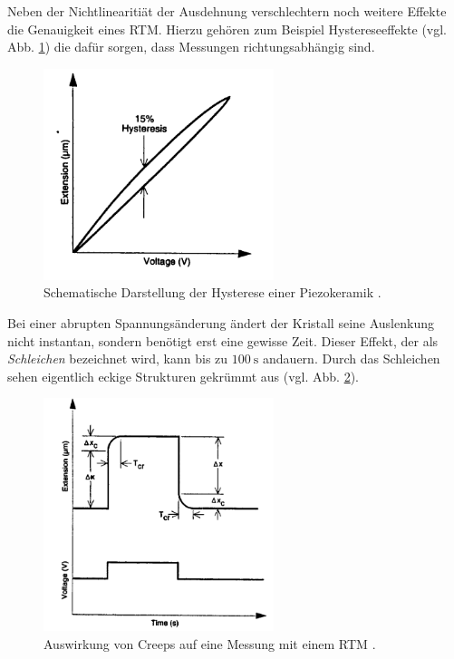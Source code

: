 Neben der Nichtlinearitiät der Ausdehnung verschlechtern noch weitere %
Effekte die Genauigkeit eines RTM. Hierzu gehören zum Beispiel Hystereseeffekte (vgl. Abb. \ref{fig: hysterese}) die dafür sorgen,
dass Messungen richtungsabhängig sind.
\begin{figure}[!h]
  \centering
  \includegraphics[width=0.6\textwidth]{./pics/hysterese.png}
  \caption{Schematische Darstellung der Hysterese einer Piezokeramik \cite{rtm}.}
  \label{fig: hysterese}
\end{figure}
Bei einer abrupten Spannungsänderung ändert der Kristall seine Auslenkung nicht instantan, sondern benötigt erst eine gewisse Zeit.
Dieser Effekt, der als \emph{Schleichen} bezeichnet wird, kann bis zu $\SI{100}{\second}$ andauern.
Durch das Schleichen sehen eigentlich eckige Strukturen gekrümmt aus (vgl. Abb. \ref{fig: creep}).
\begin{figure}[!h]
  \centering
  \includegraphics[width=0.6\textwidth]{./pics/creep.png}
  \caption{Auswirkung von Creeps auf eine Messung mit einem RTM \cite{rtm}.}
  \label{fig: creep}
\end{figure}
